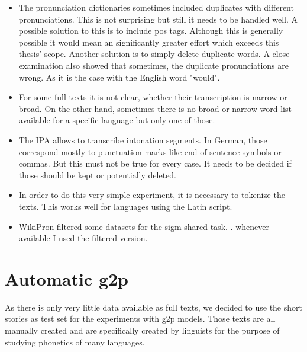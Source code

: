 \begin{itemize}
\item The pronunciation dictionaries sometimes included duplicates with different pronunciations. This is not surprising but still it needs to be handled well. A possible solution to this is to include \ac{pos} tags. Although this is generally possible it would  mean an significantly greater effort which exceeds this thesis' scope. Another solution is to simply delete duplicate words. A close examination also showed that sometimes, the duplicate pronunciations are wrong. As it is the case with the English word "would". 
\item For some full texts it is not clear, whether their transcription is narrow or broad. On the other hand, sometimes there is no broad or narrow word list available for a specific language but only one of those. 
\item The IPA allows to transcribe intonation segments. In German, those correspond mostly to punctuation marks like end of sentence symbols or commas. But this must not be true for every case. It needs to be decided if those should be kept or potentially deleted.
\item In order to do this very simple experiment, it is necessary to tokenize the texts. This works well for languages using the Latin script. 
\item WikiPron filtered some datasets for the \ac{sigm} shared task. . whenever available I used the filtered version.
\end{itemize}



\section{Automatic \ac{g2p}}
As there is only very little data available as full texts, we decided to use the short stories as test set for the experiments with \ac{g2p} models. Those texts are all manually created and are specifically created by linguists for the purpose of studying phonetics of many languages. 